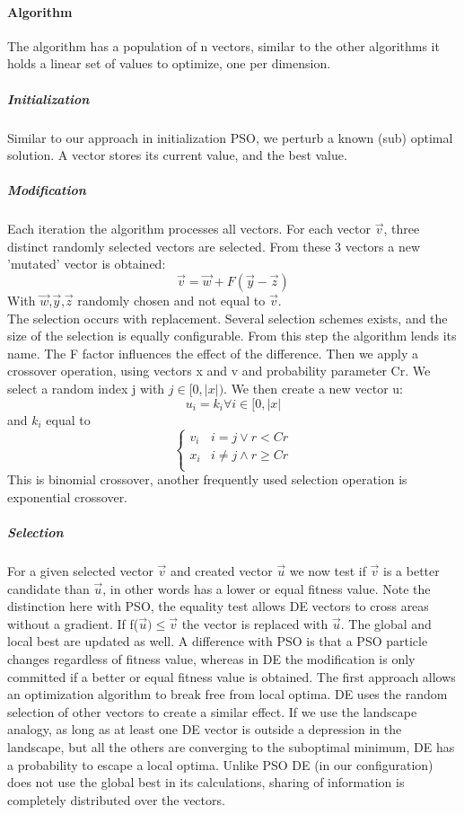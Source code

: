 \paragraph{Algorithm}
The algorithm has a population of n vectors, similar to the other algorithms it holds a linear set of values to optimize, one per dimension.  
\subparagraph{Initialization}
Similar to our approach in initialization PSO, we perturb a known (sub) optimal solution. A vector stores its current value, and the best value. 
\subparagraph{Modification}
Each iteration the algorithm processes all vectors. For each vector $\vec{v}$, three distinct randomly selected vectors are selected. From these 3 vectors a new 'mutated' vector is obtained:
\[
\vec{v} = \vec{w} + F (\vec{y} - \vec{z})
\]
With $\vec{w}$,$\vec{y}$,$\vec{z}$ randomly chosen and not equal to $\vec{v}$.\\
The selection occurs with replacement. Several selection schemes exists, and the size of the selection is equally configurable.
From this step the algorithm lends its name. The F factor influences the effect of the difference. 
Then we apply a crossover operation, using vectors x and v and probability parameter Cr.
We select a random index j with $ j \in [0, \vert x \vert)$. We then create a new vector u:
\[
u_i = k_i \forall i \in [0, \vert x \vert
\]
and $k_i$ equal to 
\[   \left\{
\begin{array}{ll}
      v_i & i = j \lor r < Cr \\
      x_i & i \neq j \land r \geq Cr \\
\end{array} 
\right.
\]
This is binomial crossover, another frequently used selection operation is exponential crossover.
\subparagraph{Selection}
For a given selected vector $\vec{v}$ and created vector $\vec{u}$ we now test if $\vec{v}$ is a better candidate than $\vec{u}$, in other words has a lower or equal fitness value. Note the distinction here with PSO, the equality test allows DE vectors to cross areas without a gradient. If f($\vec{u}) \leq  \vec{v}$ the vector is replaced with $\vec{u}$. The global and local best are updated as well. A difference with PSO is that a PSO particle changes regardless of fitness value, whereas in DE the modification is only committed if a better or equal fitness value is obtained. The first approach allows an optimization algorithm to break free from local optima. DE uses the random selection of other vectors to create a similar effect. If we use the landscape analogy, as long as at least one DE vector is outside a depression in the landscape, but all the others are converging to the suboptimal minimum, DE has a probability to escape a local optima. Unlike PSO DE (in our configuration) does not use the global best in its calculations, sharing of information is completely distributed over the vectors.
